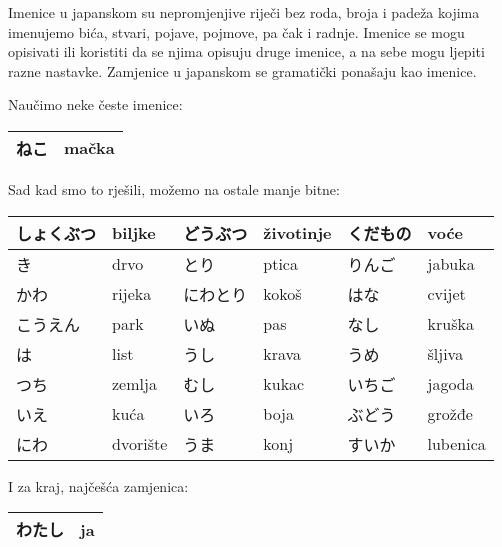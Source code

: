 
\author{Tomislav Mamić, Željka Ludošan}


	
	
	Imenice u japanskom su nepromjenjive riječi bez roda, broja i padeža kojima imenujemo bića, stvari, pojave, pojmove, pa čak i radnje. Imenice se mogu opisivati ili koristiti da se njima opisuju druge imenice, a na sebe mogu ljepiti razne nastavke. Zamjenice u japanskom se gramatički ponašaju kao imenice.

Naučimo neke česte imenice:
\vspace{10pt}

	\begin{tabular}{|l|l|}
		\hline
		ねこ&mačka\\\hline
	\end{tabular}
	\vspace{10pt}
	
	Sad kad smo to rješili, možemo na ostale manje bitne:
	
	\vspace{10pt}
	\begin{tabular}{|l|l|l|l|l|l|}
		\hline
		しょくぶつ&biljke&どうぶつ&životinje&くだもの&voće\\\hline
		き&drvo&とり&ptica&りんご&jabuka\\\hline
		かわ&rijeka&にわとり&kokoš&はな&cvijet\\\hline
		こうえん&park&いぬ&pas&なし&kruška\\\hline
		は&list&うし&krava&うめ&šljiva\\\hline
		つち&zemlja&むし&kukac&いちご&jagoda\\\hline
		いえ&kuća&いろ&boja&ぶどう&grožđe\\\hline
		にわ&dvorište&うま&konj&すいか&lubenica\\\hline
	\end{tabular}

	
	\vspace{10pt}
	I za kraj, najčešća zamjenica:
	
	\vspace{10pt}
	\begin{tabular}{|l|l|}
		\hline
		わたし&ja\\\hline
	\end{tabular}
	\vspace{10pt}


